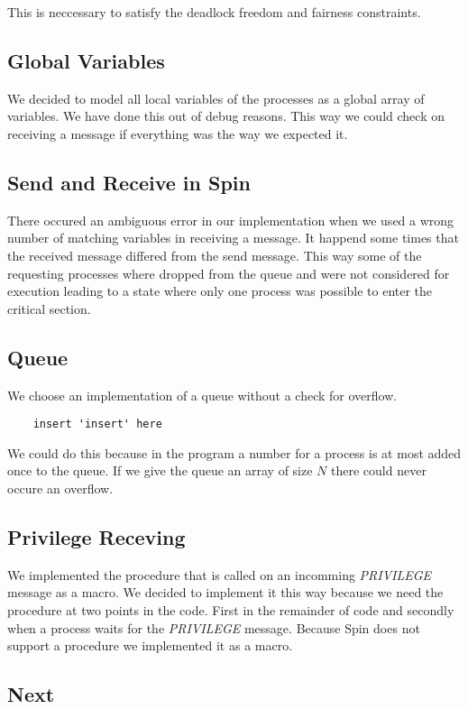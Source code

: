 \documentclass{llncs}
\begin{document}
This is neccessary to satisfy the deadlock freedom and fairness constraints.

\subsection{Global Variables}

We decided to model all local variables of the processes as a global array of variables.
We have done this out of debug reasons. This way we could check on receiving a message
if everything was the way we expected it.

\subsection{Send and Receive in Spin}

There occured an ambiguous error in our implementation when we used a wrong number of matching
variables in receiving a message. It happend some times that the received message differed from the
send message. This way some of the requesting processes where dropped from the queue and were not considered
for execution leading to a state where only one process was possible to enter the critical section.

\subsection{Queue}

We choose an implementation of a queue without a check for overflow.
\begin{lstlisting}
    insert 'insert' here
\end{lstlisting}
We could do this because in the program a number for a process is at most added once to the queue.
If we give the queue an array of size $N$ there could never occure an overflow.

\subsection{Privilege Receving}

We implemented the procedure that is called on an incomming \emph{PRIVILEGE} message as a macro.
We decided to implement it this way because we need the procedure at two points in the code.
First in the remainder of code and secondly when a process waits for the \emph{PRIVILEGE} message.
Because Spin does not support a procedure we implemented it as a macro.

\subsection{Next}
\end{document}

